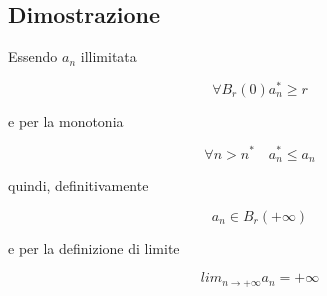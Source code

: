 \documentclass[../../dimostrazioni]{subfiles}
\begin{document}
        \subsection*{Dimostrazione}
            Essendo \(a_n\) illimitata 

            \[\forall B_r(0) a_n^* \geqslant r \]

            e per la monotonia

            \[\forall n > n^* \quad a_n^* \leqslant a_n\]

            quindi, definitivamente

            \[a_n \in B_r(+\infty)\]

            e per la definizione di limite 

            \[lim_{n \to +\infty} a_n = +\infty\]
\end{document}
